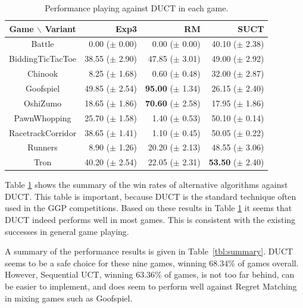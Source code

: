 \documentclass[conference]{IEEEtran}
\begin{document}
\begin{table}
\begin{center}
\begin{tabular}{|c|rrr|}
\hline
 Game $\backslash$ Variant    & Exp3		 & RM		 & SUCT		\\ 
\hline
		Battle				  & 0.00 ($\pm$ 0.00)        & 0.00 ($\pm$ 0.00)    & 40.10 ($\pm$ 2.38)  \\
         BiddingTicTacToe     & 38.55 ($\pm$ 2.90)      & 47.85 ($\pm$ 3.01)    & 49.00 ($\pm$ 2.92)    \\
                  Chinook     & 8.25 ($\pm$ 1.68)       & 0.60 ($\pm$ 0.48)     & 32.00 ($\pm$ 2.87)    \\
                Goofspiel     & 49.85 ($\pm$ 2.54)      & \textbf{95.00} ($\pm$ 1.34)    & 26.15 ($\pm$ 2.40)    \\
                 OshiZumo     & 18.65 ($\pm$ 1.86)      & \textbf{70.60} ($\pm$ 2.58)    & 17.95 ($\pm$ 1.86)    \\
             PawnWhopping     & 25.70 ($\pm$ 1.58)      & 1.40 ($\pm$ 0.53)     & 50.10 ($\pm$ 0.14)    \\
        RacetrackCorridor     & 38.65 ($\pm$ 1.41)      & 1.10 ($\pm$ 0.45)     & 50.05 ($\pm$ 0.22)    \\
                  Runners     & 8.90 ($\pm$ 1.26)       & 20.20 ($\pm$ 2.13)    & 48.55 ($\pm$ 3.06)    \\
                     Tron     & 40.20 ($\pm$ 2.54)      & 22.05 ($\pm$ 2.31)    & \textbf{53.50} ($\pm$ 2.40)    \\
\hline
\end{tabular}
\end{center}
\caption{Performance playing against DUCT in each game. \label{tbl:vsduct}}
\end{table}




Table \ref{tbl:vsduct} shows the summary of the win rates of alternative algorithms against DUCT. This table is important, because DUCT is the 
standard technique often used in the GGP competitions. Based on these results in Table \ref{tbl:vsduct} it seems that DUCT indeed performs 
well in most games. This is consistent with the existing successes in general game playing. 

A summary of the performance results is given in Table~\ref{tbl:summary}. DUCT seems to be a safe choice for these nine games, 
winning 68.34\% of games overall. 
However, Sequential UCT, winning 63.36\% of games, is not too far behind, can be easier to implement, and does seem to perform well 
against Regret Matching in mixing games such as Goofspiel.  
\end{document}
